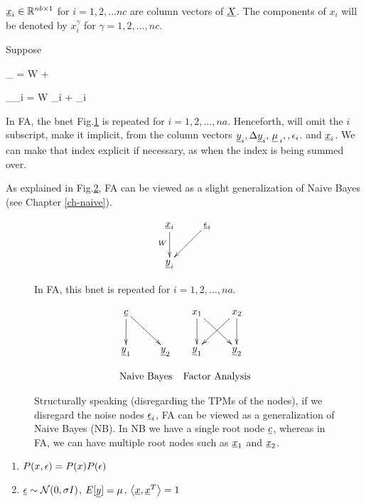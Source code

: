${\underline{x}}_i\in { \mathbb{R}}^{nb\times 1}$ for $i=1, 2, \ldots nc$ are column vectors of ${\underline{X}}$. The components of $x_i$ will be denoted by $x_i^\gamma$ for $\gamma=1,2, \ldots, nc$.

Suppose

\beq
{} _\rvY
= W \rvX + \rv{\cale}
\eeq

\beq
{} _{\rvy_i}
= W \rvx_i + \rveps_i
\eeq



In FA, the bnet Fig.\ref{fig-one-factor-bnet}
is repeated 
for $i=1, 2, \ldots, na$.
Henceforth, will omit the $i$ 
subscript, make it implicit, from 
the column vectors ${\underline{y}}_i, \Delta {\underline{y}}_i, {\,\underline{\mu}\,}_i,
,\epsilon_i$.
and ${\underline{x}}_i$.
We can make that index explicit if necessary, as when the index is being summed over.


As explained in Fig.\ref{fig-naive-v-factor},
 FA can be viewed as
a slight generalization of
Naive Bayes 
(see Chapter \ref{ch-naive}).



\begin{figure}[h!]
$$\xymatrix{
\rvx_i\ar[d]_W & \rveps_i \ar[ld]
\\
\rvy_i
}$$
\caption{In FA, this bnet is repeated
for $i=1,2,\ldots, na$.  }
\label{fig-one-factor-bnet}
\end{figure}

\begin{figure}[h!]
$$
\begin{array}{cc}
\xymatrix{
\rvc\ar[d] \ar[dr]
&
\\
\rvy_1 & \rvy_2
}
&
\xymatrix{
x_1\ar[d]\ar[dr]& x_2\ar[dl]\ar[d]
\\
\rvy_1 & \rvy_2}
\\
\\
\text{Naive Bayes} & 
\text{Factor Analysis}
\end{array}
$$
\caption{Structurally speaking
(disregarding the TPMs of the nodes), if we disregard the noise nodes $\underline{\epsilon}_i$, FA can be viewed as a generalization of
Naive Bayes (NB). In NB we have a single root node ${\underline{c}}$, whereas in FA,
we can have multiple root nodes such as ${\underline{x}}_1$ and 
${\underline{x}}_2$.}
\label{fig-naive-v-factor}
\end{figure}




\begin{enumerate}

\item $P(x, \epsilon)=P(x)P(\epsilon)$

\item $\underline{\epsilon}\sim {\cal N}(0, \sigma I)$, $E[{\underline{y}}]=\mu$,
$\left\langle{\underline{x}}, {\underline{x}}^T\right\rangle=1$

\end{enumerate}

